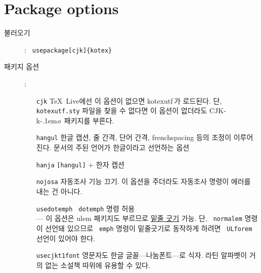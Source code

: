 \documentclass[dvipdfmx,b5paper]{article}
\def\cs#1{\texttt{\color{teal}\char92 #1}}
\def\cjkko{\mbox{CJK-k\kern-.1em\textit{o}}}
\begin{document}
\section{Package options}
  \begin{description}
    \item[불러오기]: \quad\cs{usepackage[cjk]\{kotex\}}
      \medskip
    \item[패키지 옵션]:
      \begin{itemize}
	\item[\texttt{cjk}] \TeX\ Live에선 이 옵션이 없으면 kotexutf\,가
	  로드된다. 단, \verb|kotexutf.sty| 파일을 찾을 수 없다면
	  이 옵션이 없더라도 \cjkko\ 패키지를 부른다.
	\item[\texttt{hangul}] 한글 캡션, 줄 간격, 단어 간격, frenchspacing
	  등의 조정이 이루어진다. 문서의 주된 언어가 한글이라고 선언하는 옵션
	\item[\texttt{hanja}] \verb|[hangul]| $+$ 한자 캡션
	\item[\texttt{nojosa}] 자동조사 기능 끄기. 이 옵션을 주더라도
	  자동조사 명령이 에러를 내는 건 아니다.
	\item[\texttt{usedotemph}] \cs{dotemph} 명령 허용\\
	  --- 이 옵션은 ulem 패키지도 부르므로 \uline{밑줄 긋기} 가능.
	  단, \cs{normalem} 명령이 선언돼 있으므로 \cs{emph} 명령이
	  밑줄긋기로 동작하게 하려면 \cs{ULforem} 선언이 있어야 한다.
	\item[\texttt{usecjkt1font}] 영문자도 한글 글꼴---나눔폰트---로 식자.
	   라틴 알파벳이 거의 없는 소설책 따위에 유용할 수 있다.
      \end{itemize}
  \end{description}
\end{document}
